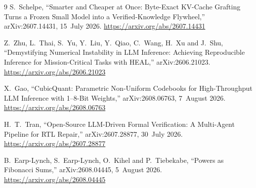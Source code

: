 \documentclass[11pt]{article}
\theoremstyle{definition}
\begin{document}
\begin{thebibliography}{9}
 S.~Schelpe, ``Smarter and Cheaper at Once: Byte-Exact KV-Cache Grafting Turns a Frozen Small Model into a Verified-Knowledge Flywheel,'' arXiv:2607.14431, 15~July 2026. \url{https://arxiv.org/abs/2607.14431}

 Z.~Zhu, L.~Thai, S.~Yu, Y.~Liu, Y.~Qiao, C.~Wang, H.~Xu and J.~Shu, ``Demystifying Numerical Instability in LLM Inference: Achieving Reproducible Inference for Mission-Critical Tasks with HEAL,'' arXiv:2606.21023. \url{https://arxiv.org/abs/2606.21023}

 X.~Gao, ``CubicQuant: Parametric Non-Uniform Codebooks for High-Throughput LLM Inference with 1--8-Bit Weights,'' arXiv:2608.06763, 7~August 2026. \url{https://arxiv.org/abs/2608.06763}

 H.~T.~Tran, ``Open-Source LLM-Driven Formal Verification: A Multi-Agent Pipeline for RTL Repair,'' arXiv:2607.28877, 30~July 2026. \url{https://arxiv.org/abs/2607.28877}

 B.~Earp-Lynch, S.~Earp-Lynch, O.~Kihel and P.~Tiebekabe, ``Powers as Fibonacci Sums,'' arXiv:2608.04445, 5~August 2026. \url{https://arxiv.org/abs/2608.04445}

\end{thebibliography}
\end{document}
